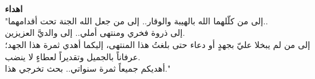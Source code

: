 \chapter*{}

\vfill
\begin{center}
	\large\amirifont
	\textbf{اهداء}\\[10pt]
	"إلى من كلّلهما الله بالهيبة والوقار.. إلى من جعل الله الجنة تحت أقدامهما..\\
	إلى ذروة فخري ومنتهى أملي.. إلى والديَّ العزيزين.\\
	إلى من لم يبخلا عليّ بجهدٍ أو دعاء حتى بلغتُ هذا المنتهى، إليكما أهدي ثمرة هذا الجهد؛ عرفاناً بالجميل وتقديراً لعطاءٍ لا ينضب.\\
	أهديكم جميعاً ثمرة سنواتي.. بحث تخرجي هذا."
\end{center}
\vfill